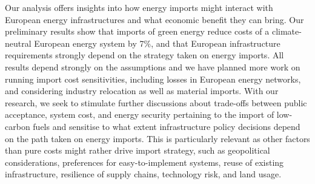 \documentclass[10pt,5p,reversenotenum,lefttitle]{elsarticle}
\renewcommand{\ttdefault}{\sfdefault}
\begin{document}
Our analysis offers insights into how energy imports might interact with
European energy infrastructures and what economic benefit they can bring. Our
preliminary results show that imports of green energy reduce costs of a
climate-neutral European energy system by 7\%, and that European infrastructure
requirements strongly depend on the strategy taken on energy imports. All
results depend strongly on the assumptions and we have planned more work on
running import cost sensitivities, including losses in European energy networks,
and considering industry relocation as well as material imports. With our
research, we seek to stimulate further discussions about trade-offs between
public acceptance, system cost, and energy security pertaining to the import of
low-carbon fuels and sensitise to what extent infrastructure policy decisions
depend on the path taken on energy imports. This is particularly relevant as
other factors than pure costs might rather drive import strategy, such as
geopolitical considerations, preferences for easy-to-implement systems, reuse of
existing infrastructure, resilience of supply chains, technology risk, and land
usage.

\renewcommand{\ttdefault}{\sfdefault}

\end{document}
